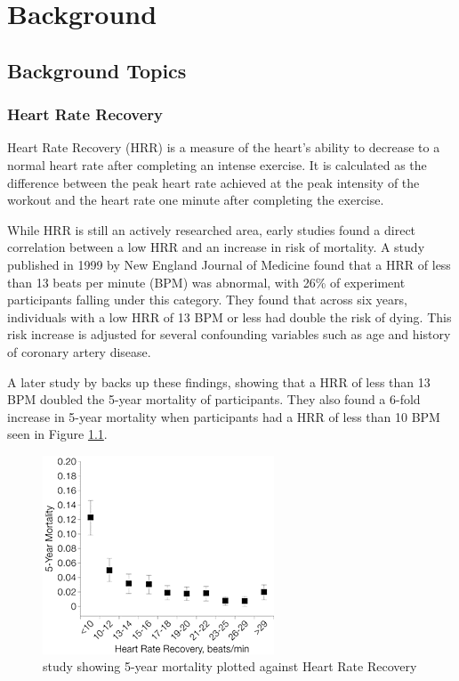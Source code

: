 \documentclass{l4proj}
\begin{document}
\chapter{Background}
\label{sec:background}

\section{Background Topics}
\label{sec:backgroundtopics}

\subsection{Heart Rate Recovery}
\label{sec:backgroundhrr}

Heart Rate Recovery (HRR) is a measure of the heart’s ability to decrease to a normal heart rate after completing an intense exercise. It is calculated as the difference between the peak heart rate achieved at the peak intensity of the workout and the heart rate one minute after completing the exercise. 

While HRR is still an actively researched area, early studies found a direct correlation between a low HRR and an increase in risk of mortality. A study published in 1999 by New England Journal of Medicine \cite{Cole1999HeartRate} found that a HRR of less than 13 beats per minute (BPM) was abnormal, with 26\% of experiment participants falling under this category. They found that across six years, individuals with a low HRR of 13 BPM or less had double the risk of dying. This risk increase is adjusted for several confounding variables such as age and history of coronary artery disease.

A later study by \cite{HRR2000} backs up these findings, showing that a HRR of less than 13 BPM doubled the 5-year mortality of participants. They also found a 6-fold increase in 5-year mortality when participants had a HRR of less than 10 BPM seen in Figure \ref{fig:backgroundhrr}.

\begin{figure}[h!]
    \centering
    \includegraphics[width=0.5\linewidth]{dissertation//dissImages/BackgroundHRR.png}
    \caption{\cite{HRR2000} study showing 5-year mortality plotted against Heart Rate Recovery}
    \label{fig:backgroundhrr}
\end{figure}
\end{document}
